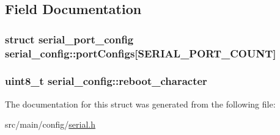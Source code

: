 \subsection{Field Documentation}
\hypertarget{structserial__config_a63f189e92594c1d9b5e88f21b238e20e}{
\subsubsection[{port\+Configs}]{\setlength{\rightskip}{0pt plus 5cm}struct {\bf serial\+\_\+port\+\_\+config} serial\+\_\+config\+::port\+Configs\mbox{[}{\bf S\+E\+R\+I\+A\+L\+\_\+\+P\+O\+R\+T\+\_\+\+C\+O\+U\+N\+T}\mbox{]}}}\label{structserial__config_a63f189e92594c1d9b5e88f21b238e20e}
\hypertarget{structserial__config_a15086bf33d55fea46273d4f761f9dffb}{
\subsubsection[{reboot\+\_\+character}]{\setlength{\rightskip}{0pt plus 5cm}uint8\+\_\+t serial\+\_\+config\+::reboot\+\_\+character}}\label{structserial__config_a15086bf33d55fea46273d4f761f9dffb}


The documentation for this struct was generated from the following file\+:\begin{DoxyCompactItemize}
\item 
src/main/config/\hyperlink{config_2serial_8h}{serial.\+h}\end{DoxyCompactItemize}
